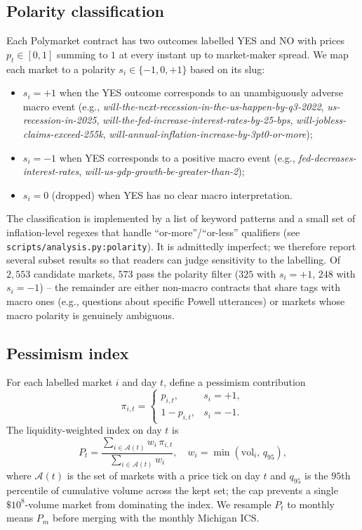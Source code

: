 \documentclass{article}
\begin{document}
\subsection{Polarity classification}
\label{sec:polarity}
Each Polymarket contract has two outcomes labelled YES and NO with prices
$p_t \in [0,1]$ summing to $1$ at every instant up to market-maker
spread. We map each market to a polarity
$s_i \in \{-1, 0, +1\}$ based on its slug:
\begin{itemize}
\item $s_i = +1$ when the YES outcome corresponds to an unambiguously
  adverse macro event (e.g., \emph{will-the-next-recession-in-the-us-happen-by-q3-2022},
  \emph{us-recession-in-2025}, \emph{will-the-fed-increase-interest-rates-by-25-bps},
  \emph{will-jobless-claims-exceed-255k}, \emph{will-annual-inflation-increase-by-3pt0-or-more});
\item $s_i = -1$ when YES corresponds to a positive macro event (e.g.,
  \emph{fed-decreases-interest-rates}, \emph{will-us-gdp-growth-be-greater-than-2});
\item $s_i = 0$ (dropped) when YES has no clear macro interpretation.
\end{itemize}
The classification is implemented by a list of keyword patterns and a
small set of inflation-level regexes that handle ``or-more''/``or-less''
qualifiers (see \texttt{scripts/analysis.py:polarity}). It is admittedly
imperfect; we therefore report several subset results so that readers
can judge sensitivity to the labelling. Of $2{,}553$ candidate markets,
$573$ pass the polarity filter ($325$ with $s_i = +1$, $248$ with
$s_i = -1$) -- the remainder are either non-macro contracts that share
tags with macro ones (e.g., questions about specific Powell utterances)
or markets whose macro polarity is genuinely ambiguous.

\subsection{Pessimism index}
For each labelled market $i$ and day $t$, define a pessimism contribution
\[
\pi_{i,t} = \begin{cases} p_{i,t}, & s_i = +1, \\ 1 - p_{i,t}, & s_i = -1. \end{cases}
\]
The liquidity-weighted index on day $t$ is
\[
P_t = \frac{\sum_{i \in \mathcal{A}(t)} w_i\,\pi_{i,t}}{\sum_{i \in \mathcal{A}(t)} w_i},
\quad w_i = \min(\mathrm{vol}_i,\, q_{95}),
\]
where $\mathcal{A}(t)$ is the set of markets with a price tick on day
$t$ and $q_{95}$ is the $95$th percentile of cumulative volume across
the kept set; the cap prevents a single $\$10^8$-volume market from
dominating the index. We resample $P_t$ to monthly means
$P_{m}$ before merging with the monthly Michigan ICS.
\end{document}
